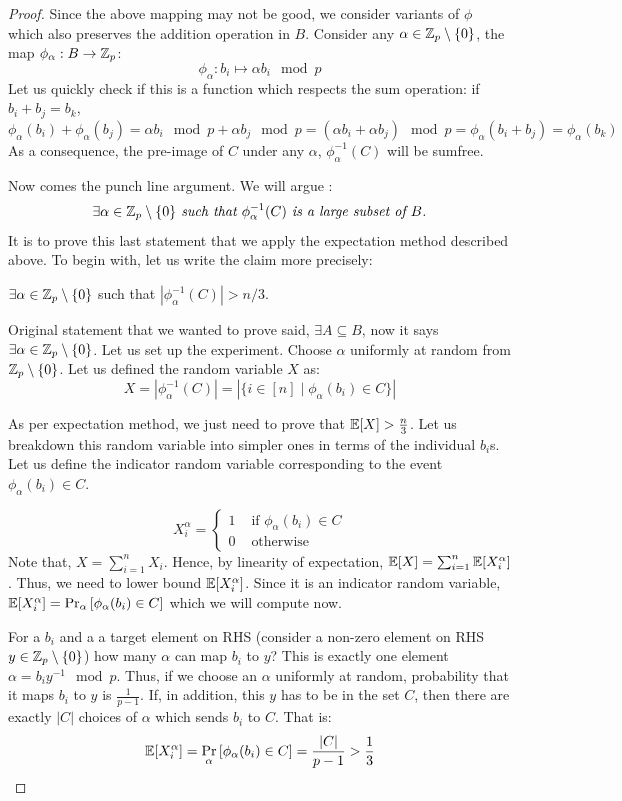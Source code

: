 \begin{proof}
 Since the above mapping may not be good, we consider variants of $\phi$ which also preserves the addition operation  in $B$. Consider any $\alpha \in {\mathbb{Z}}_p \setminus \{0\}$, the map $\phi_\alpha : B \to {\mathbb{Z}}_p$:
$$\phi_\alpha : b_i \mapsto \alpha b_i \mod p$$
Let us quickly check if this is a function which respects the sum operation: if $b_i+b_j = b_k$, $\phi_\alpha(b_i)+\phi_\alpha(b_j)=\alpha b_i \mod p +\alpha b_j \mod p = (\alpha b_i+\alpha b_j) \mod p = \phi_\alpha(b_i+b_j) = \phi_\alpha(b_k)$
As a consequence, the pre-image of $C$ under any $\alpha$, $\phi_\alpha^{-1}(C)$  will be sumfree.

\noindent Now comes the punch line argument. We will argue :
$$\textrm{\em $\exists \alpha \in {\mathbb{Z}}_p\setminus\{0\}$ such that $\phi_\alpha^{-1}(C)$ is a large subset of $B$.}$$
It is to prove this last statement that we apply the expectation method described above. To begin with, let us write the claim more precisely:
\begin{claim}
$\exists \alpha \in {\mathbb{Z}}_p\setminus\{0\}$ such that $|\phi_\alpha^{-1}(C)| > n/3$.
\end{claim}

Original statement that we wanted to prove said, $\exists A \subseteq B$, now it says $\exists \alpha \in {\mathbb{Z}}_p \setminus \{0\}$. Let us set up the experiment.
Choose $\alpha$ uniformly at random from ${\mathbb{Z}}_p \setminus \{0\}$. Let us defined the random variable $X$ as:
$$X = |\phi_\alpha^{-1}(C)| = |\{ i \in [n] \mid \phi_\alpha(b_i) \in C \}|$$

As per expectation method, we just need to prove that ${\mathbb E}[X] > \frac{n}{3}$. Let us breakdown this random variable into simpler ones in terms of the individual $b_i$s. Let us define the indicator random variable corresponding to the event $\phi_\alpha (b_i) \in C$.

$$X_i^{\alpha} = \left\{
\begin{array}{ll}
1 & \textrm{ if $\phi_\alpha (b_i) \in C$} \\
0 & \textrm{ otherwise}
\end{array}
\right.
$$
Note that, $X = \sum_{i=1}^n X_i$. Hence, by linearity of expectation, ${\mathbb E}[X] = \sum_{i=1}^n {\mathbb E}[X_i^{\alpha}]$. Thus, we need to lower bound ${\mathbb E}[X_i^{\alpha}]$. Since it is an indicator random variable, ${\mathbb E}[X_i^{\alpha}] = \Pr_\alpha\left[\phi_\alpha (b_i) \in C\right]$ which we will compute now.

For a $b_i$ and a a target element on RHS (consider a non-zero element on RHS $y \in {\mathbb{Z}}_p \setminus \{0\}$) how many $\alpha$ can map $b_i$ to $y$? This is exactly one element $\alpha = b_iy^{-1} \mod p$. Thus, if we choose an $\alpha$ uniformly at random, probability that it maps $b_i$ to $y$ is $\frac{1}{p-1}$. If, in addition, this $y$ has to be in the set $C$, then there are exactly $|C|$ choices of $\alpha$ which sends $b_i$ to $C$. That is:
$${\mathbb E}[X_i^{\alpha}] = \Pr_\alpha\left[\phi_\alpha (b_i) \in C\right] = \frac{|C|}{p-1} > \frac{1}{3}$$


\end{proof}
